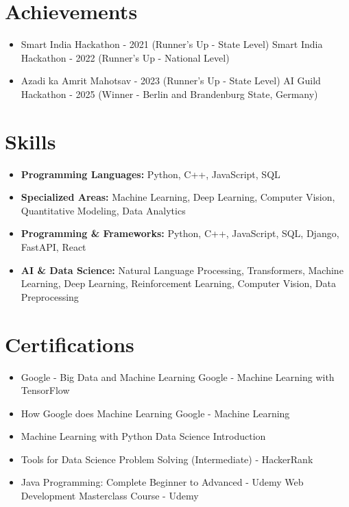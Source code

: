 \documentclass[a4paper,10pt]{article}
\begin{document}
\section*{Achievements}
\begin{itemize}
\item Smart India Hackathon - 2021 (Runner's Up - State Level) \hfill Smart India Hackathon - 2022 (Runner's Up - National Level)
\item Azadi ka Amrit Mahotsav - 2023 (Runner's Up - State Level) \hfill AI Guild Hackathon - 2025 (Winner - Berlin and Brandenburg State, Germany)
\end{itemize}

\section*{Skills}
\begin{itemize}
  \item \textbf{Programming Languages:} Python, C++, JavaScript, SQL
  \item \textbf{Specialized Areas:} Machine Learning, Deep Learning, Computer Vision, Quantitative Modeling, Data Analytics
  \item \textbf{Programming \& Frameworks:} Python, C++, JavaScript, SQL, Django, FastAPI, React
  \item \textbf{AI \& Data Science:} Natural Language Processing, Transformers, Machine Learning, Deep Learning, Reinforcement Learning, Computer Vision, Data Preprocessing
\end{itemize}

\section*{Certifications}
\begin{itemize}
\item Google - Big Data and Machine Learning \hfill Google - Machine Learning with TensorFlow
\item How Google does Machine Learning \hfill Google - Machine Learning
\item Machine Learning with Python \hfill Data Science Introduction
\item Tools for Data Science \hfill Problem Solving (Intermediate) - HackerRank
\item Java Programming: Complete Beginner to Advanced - Udemy \hfill Web Development Masterclass Course - Udemy
\end{itemize}
\end{document}
